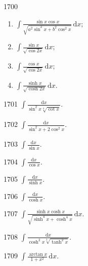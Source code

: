 \begin{prob}[L]{1700}
\begin{enumerate}[label=(\alph*), itemsep=2pt, topsep=3pt]
\item $\displaystyle\int \frac{\sin x\cos x}{\sqrt{a^2\sin^2 x + b^2\cos^2 x}}\,\mathrm{d}x;$
\item $\displaystyle\int \frac{\sin x}{\sqrt{\cos 2x}}\,\mathrm{d}x;$
\item $\displaystyle\int \frac{\cos x}{\sqrt{\cos 2x}}\,\mathrm{d}x;$
\item $\displaystyle\int \frac{\sinh x}{\sqrt{\cosh 2x}}\,\mathrm{d}x.$
\end{enumerate}
\end{prob}

\begin{prob}[S]{1701}
$\displaystyle\int \frac{\mathrm{d}x}{\sin^2 x\sqrt[4]{\cot x}}.$
\end{prob}

\begin{prob}[S]{1702}
$\displaystyle\int \frac{\mathrm{d}x}{\sin^2 x + 2\cos^2 x}.$
\end{prob}

\begin{prob}[S]{1703}
$\displaystyle\int \frac{\mathrm{d}x}{\sin x}.$
\end{prob}

\begin{prob}[S]{1704}
$\displaystyle\int \frac{\mathrm{d}x}{\cos x}.$
\end{prob}

\begin{prob}[S]{1705}
$\displaystyle\int \frac{\mathrm{d}x}{\sinh x}.$
\end{prob}

\begin{prob}[S]{1706}
$\displaystyle\int \frac{\mathrm{d}x}{\cosh x}.$
\end{prob}

\begin{prob}[S]{1707}
$\displaystyle\int \frac{\sinh x\cosh x}{\sqrt{\sinh^4 x + \cosh^4 x}}\,\mathrm{d}x.$
\end{prob}

\begin{prob}[S]{1708}
$\displaystyle\int \frac{\mathrm{d}x}{\cosh^2 x\sqrt[3]{\tanh^2 x}}.$
\end{prob}

\begin{prob}[S]{1709}
$\displaystyle\int \frac{\arctan x}{1 + x^2}\,\mathrm{d}x.$
\end{prob}


